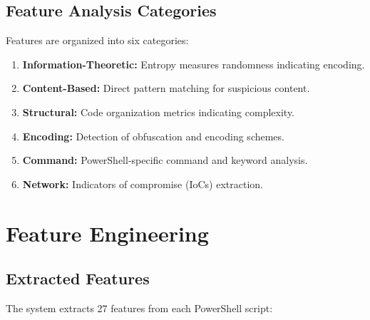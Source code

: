 \documentclass[10pt,conference,a4paper]{IEEEtran}
\begin{document}
\subsection{Feature Analysis Categories}

Features are organized into six categories:

\begin{enumerate}
\item \textbf{Information-Theoretic:} Entropy measures randomness indicating encoding.
\item \textbf{Content-Based:} Direct pattern matching for suspicious content.
\item \textbf{Structural:} Code organization metrics indicating complexity.
\item \textbf{Encoding:} Detection of obfuscation and encoding schemes.
\item \textbf{Command:} PowerShell-specific command and keyword analysis.
\item \textbf{Network:} Indicators of compromise (IoCs) extraction.
\end{enumerate}

\section{Feature Engineering}

\subsection{Extracted Features}

The system extracts 27 features from each PowerShell script:
\end{document}
